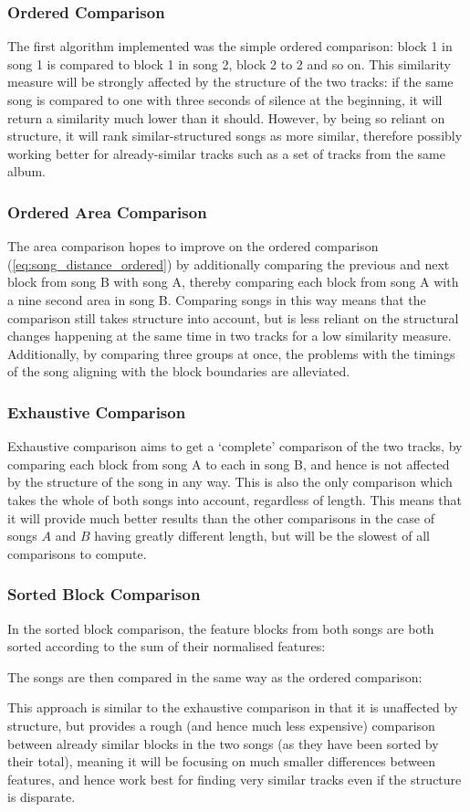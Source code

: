\label{text:method:comparison_methods}
\subsubsection{Ordered Comparison}

The first algorithm implemented was the simple ordered comparison: block 1 in song 1 is compared to block 1 in song 2, block 2 to 2 and so on. This similarity measure will be strongly affected by the structure of the two tracks: if the same song is compared to one with three seconds of silence at the beginning, it will return a similarity much lower than it should. However, by being so reliant on structure, it will rank similar-structured songs as more similar, therefore possibly working better for already-similar tracks such as a set of tracks from the same album.
\subsubsection{Ordered Area Comparison}

The area comparison hopes to improve on the ordered comparison (\ref{eq:song_distance_ordered}) by additionally comparing the previous and next block from song B with song A, thereby comparing each block from song A with a nine second area in song B. Comparing songs in this way means that the comparison still takes structure into account, but is less reliant on the structural changes happening at the same time in two tracks for a low similarity measure. Additionally, by comparing three groups at once, the problems with the timings of the song aligning with the block boundaries are alleviated.
\subsubsection{Exhaustive Comparison}

Exhaustive comparison aims to get a `complete' comparison of the two tracks, by comparing each block from song A to each in song B, and hence is not affected by the structure of the song in any way. This is also the only comparison which takes the whole of both songs into account, regardless of length. This means that it will provide much better results than the other comparisons in the case of songs $A$ and $B$ having greatly different length, but will be the slowest of all comparisons to compute.
\subsubsection{Sorted Block Comparison}
In the sorted block comparison, the feature blocks from both songs are both sorted according to the sum of their normalised features:

The songs are then compared in the same way as the ordered comparison:

This approach is similar to the exhaustive comparison in that it is unaffected by structure, but provides a rough (and hence much less expensive) comparison between already similar blocks in the two songs (as they have been sorted by their total), meaning it will be focusing on much smaller differences between features, and hence work best for finding very similar tracks even if the structure is disparate.
